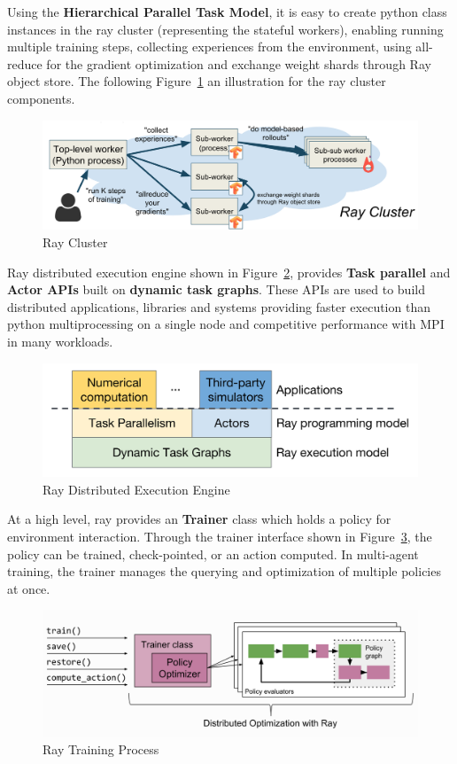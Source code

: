 Using the \textbf{Hierarchical Parallel Task Model}, it is easy to create python class instances in the ray cluster (representing the stateful workers), enabling running multiple training steps, collecting experiences from the environment, using all-reduce for the gradient optimization and exchange weight shards through Ray object store. The following Figure~\ref{fig:ray_cluster} an illustration for the ray cluster components.
\begin{figure}[!htb]
	\centering
	\includegraphics[width=\linewidth]{figures/architecture/ray_cluster.png}
	\caption{Ray Cluster}
	\label{fig:ray_cluster}
\end{figure}

Ray distributed execution engine shown in Figure~\ref{fig:ray_engine}, provides \textbf{Task parallel} and \textbf{Actor APIs} built on \textbf{dynamic task graphs}. These APIs are used to build distributed applications, libraries and systems providing faster execution than python multiprocessing on a single node and competitive performance with MPI in many workloads.
\begin{figure}[!htb]
	\centering
	\includegraphics[width=\linewidth]{figures/architecture/ray_engine.png}
	\caption{Ray Distributed Execution Engine}
	\label{fig:ray_engine}
\end{figure}


At a high level, ray provides an \textbf{\colorbox{gray!20}{Trainer}} class which holds a policy for environment interaction. Through the trainer interface shown in Figure~\ref{fig:ray_trainer}, the policy can be trained, check-pointed, or an action computed. In multi-agent training, the trainer manages the querying and optimization of multiple policies at once. 
\begin{figure}[!htb]
	\centering
	\includegraphics[width=\textwidth]{figures/architecture/ray_trainer.png}
	\caption{Ray Training Process}
	\label{fig:ray_trainer}
\end{figure}

